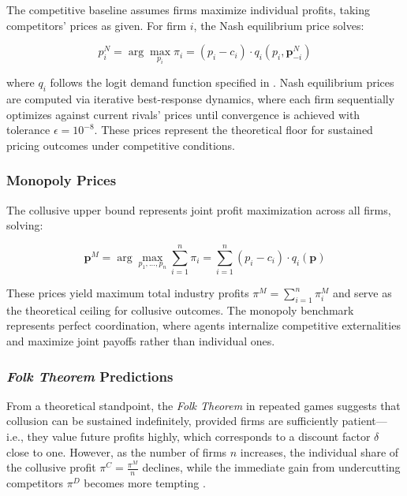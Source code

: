 The competitive baseline assumes firms maximize individual profits, taking competitors' prices as given. For firm $i$, the Nash equilibrium price solves:

\begin{equation}\label{eq:nash}
    p_i^{N} = \arg\max_{p_i} \pi_i = (p_i - c_i) \cdot q_i(p_i, \mathbf{p}_{-i}^N)
\end{equation}

where $q_i$ follows the logit demand function specified in . Nash equilibrium prices are computed via iterative best-response dynamics, where each firm sequentially optimizes against current rivals' prices until convergence is achieved with tolerance $\epsilon = 10^{-8}$. These prices represent the theoretical floor for sustained pricing outcomes under competitive conditions.

\subsubsection*{Monopoly Prices}

The collusive upper bound represents joint profit maximization across all firms, solving:

\begin{equation}\label{eq:monop}
    \mathbf{p}^M = \arg\max_{p_1,...,p_n} \sum_{i=1}^n \pi_i = \sum_{i=1}^n (p_i - c_i) \cdot q_i(\mathbf{p})
\end{equation}

These prices yield maximum total industry profits $\pi^M = \sum_{i=1}^n \pi_i^M$ and serve as the theoretical ceiling for collusive outcomes. The monopoly benchmark represents perfect coordination, where agents internalize competitive externalities and maximize joint payoffs rather than individual ones.

    \subsubsection*{\emph{Folk Theorem} Predictions}

From a theoretical standpoint, the \emph{Folk Theorem} in repeated games suggests that collusion can be sustained indefinitely, provided firms are sufficiently patient---i.e., they value future profits highly, which corresponds to a discount factor $\delta$ close to one. However, as the number of firms $n$ increases, the individual share of the collusive profit $\pi^C = \frac{\pi^M}{n}$ declines, while the immediate gain from undercutting competitors $\pi^D$ becomes more tempting \parencite{ivaldi_chapter_2007, tirole_theory_1988}.

